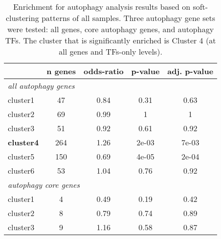         
             \begin{table}[!h]
            \centering
            \footnotesize
            \caption[Enrichment analysis results based on soft-clustering of all samples ]{Enrichment for autophagy analysis results based on soft-clustering patterns of all samples. Three autophagy gene sets were tested: all genes, core autophagy genes, and autophagy TFs. The cluster that is significantly enriched is Cluster 4 (at all genes and TFs-only levels). }
            \label{table:mfuzzall}
            \begin{tabular}{lcccc}
            \multicolumn{1}{l|}{} & \multicolumn{1}{l|}{\textbf{n genes}} & \multicolumn{1}{l|}{\textbf{odds-ratio}} & \multicolumn{1}{l|}{\textbf{p-value}} & \multicolumn{1}{l}{\textbf{adj. p-value}} \\ \hline
            \multicolumn{5}{l}{\textit{all autophagy genes}} \\ \hline
            \multicolumn{1}{l|}{cluster1} & \multicolumn{1}{c|}{47} & \multicolumn{1}{c|}{0.84} & \multicolumn{1}{c|}{0.31} & 0.63 \\ \hline
            \multicolumn{1}{l|}{cluster2} & \multicolumn{1}{c|}{69} & \multicolumn{1}{c|}{0.99} & \multicolumn{1}{c|}{1} & 1 \\ \hline
            \multicolumn{1}{l|}{cluster3} & \multicolumn{1}{c|}{51} & \multicolumn{1}{c|}{0.92} & \multicolumn{1}{c|}{0.61} & 0.92 \\ \hline
            \multicolumn{1}{l|}{\textbf{cluster4}} & \multicolumn{1}{c|}{264} & \multicolumn{1}{c|}{1.26} & \multicolumn{1}{c|}{2e-03} & 7e-03 \\ \hline
            \multicolumn{1}{l|}{cluster5} & \multicolumn{1}{c|}{150} & \multicolumn{1}{c|}{0.69} & \multicolumn{1}{c|}{4e-05} & 2e-04 \\ \hline
            \multicolumn{1}{l|}{cluster6} & \multicolumn{1}{c|}{53} & \multicolumn{1}{c|}{1.04} & \multicolumn{1}{c|}{0.76} & 0.92 \\ \hline
            \multicolumn{5}{l}{\textit{autophagy core genes}} \\ \hline
            \multicolumn{1}{l|}{cluster1} & \multicolumn{1}{c|}{4} & \multicolumn{1}{c|}{0.49} & \multicolumn{1}{c|}{0.19} & 0.42 \\ \hline
            \multicolumn{1}{l|}{cluster2} & \multicolumn{1}{c|}{8} & \multicolumn{1}{c|}{0.79} & \multicolumn{1}{c|}{0.74} & 0.89 \\ \hline
            \multicolumn{1}{l|}{cluster3} & \multicolumn{1}{c|}{9} & \multicolumn{1}{c|}{1.16} & \multicolumn{1}{c|}{0.58} & 0.87 \\ \hline

\end{tabular}
\end{table}
